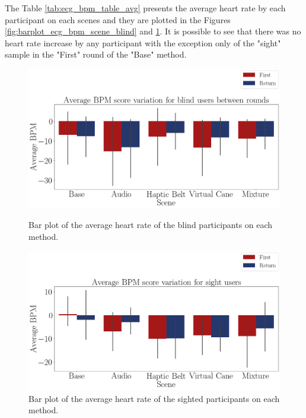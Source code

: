 The Table \ref{tab:ecg_bpm_table_avg} presents the average heart rate by each participant on each scenes and they are plotted in the Figures \ref{fig:barplot_ecg_bpm_scene_blind} and \ref{fig:barplot_ecg_bpm_scene_sight}. It is possible to see that there was no heart rate increase by any participant with the exception only of the "sight" sample in the "First" round of the "Base" method.



\begin{figure}[!htb]
    \centering
    \begin{minipage}{\textwidth}
        \centering
        \includegraphics[width = 0.8\linewidth]{Resultados/ECG/Figuras/png/barplot_ecg_bpm_scene_blind.png}
        \caption{Bar plot of the average heart rate of the blind participants on each method.}
        \label{fig:barplot_ecg_bpm_scene_blind}
    \end{minipage}
    \begin{minipage}{\textwidth}
        \centering
        \includegraphics[width = 0.8\linewidth]{Resultados/ECG/Figuras/png/barplot_ecg_bpm_scene_sight.png}
        \caption{Bar plot of the average heart rate of the sighted participants on each method.}
        \label{fig:barplot_ecg_bpm_scene_sight}
    \end{minipage}
\end{figure}


